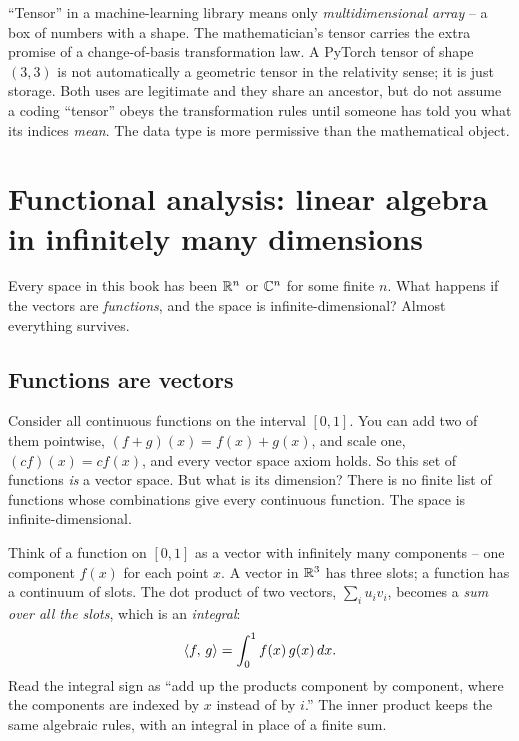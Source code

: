 \begin{trapbox}
``Tensor'' in a machine-learning library means only \emph{multidimensional array} --
a box of numbers with a shape. The mathematician's tensor carries the extra promise
of a change-of-basis transformation law. A PyTorch tensor of shape $(3,3)$ is not
automatically a geometric tensor in the relativity sense; it is just storage. Both
uses are legitimate and they share an ancestor, but do not assume a coding
``tensor'' obeys the transformation rules until someone has told you what its
indices \emph{mean}. The data type is more permissive than the mathematical object.
\end{trapbox}

\section{Functional analysis: linear algebra in infinitely many dimensions}
\label{ch37:functional}

Every space in this book has been $\mathbb{R}^n$ or $\mathbb{C}^n$ for
some finite $n$. What
happens if the vectors are \emph{functions}, and the space is infinite-dimensional?
Almost everything survives.

\subsection{Functions are vectors}
\label{ch37:functions-are-vectors}

Consider all continuous functions on the interval $[0,1]$. You can add two of them
pointwise, $(f+g)(x)=f(x)+g(x)$, and scale one, $(cf)(x)=cf(x)$, and every vector
space axiom holds. So this set of functions \emph{is} a vector space. But what is
its dimension? There is no finite list of functions whose combinations give every
continuous function. The space is infinite-dimensional.

\begin{intuitionbox}
Think of a function on $[0,1]$ as a vector with infinitely many components -- one
component $f(x)$ for each point $x$. A vector in $\mathbb{R}^3$ has three slots; a function
has a continuum of slots. The dot product of two vectors, $\sum_i u_i v_i$, becomes
a \emph{sum over all the slots}, which is an \emph{integral}:
\[
  \langle f,\, g \rangle = \int_0^1 f(x)\,g(x)\,dx.
\]
Read the integral sign as ``add up the products component by component, where the
components are indexed by $x$ instead of by $i$.'' The inner product keeps the
same algebraic rules, with an integral in place of a finite sum.
\end{intuitionbox}

